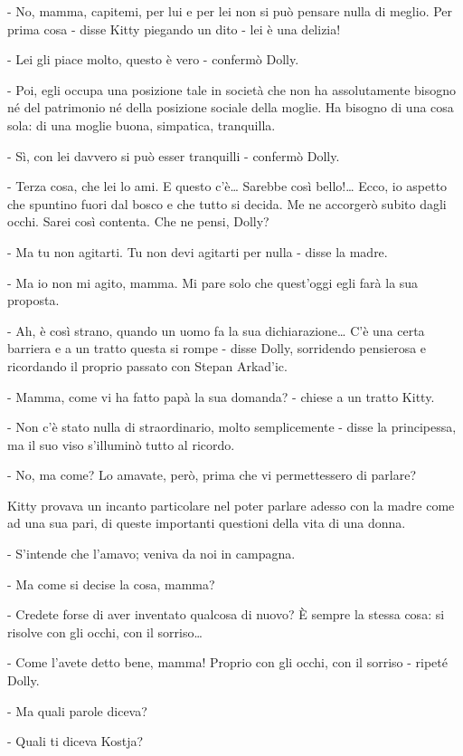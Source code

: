 - No, mamma, capitemi, per lui e per lei non si può pensare nulla di meglio. Per prima cosa - disse Kitty piegando un dito - lei è una delizia! 

- Lei gli piace molto, questo è vero - confermò Dolly. 

- Poi, egli occupa una posizione tale in società che non ha assolutamente bisogno né del patrimonio né della posizione sociale della moglie. Ha bisogno di una cosa sola: di una moglie buona, simpatica, tranquilla. 

- Sì, con lei davvero si può esser tranquilli - confermò Dolly. 

- Terza cosa, che lei lo ami. E questo c'è\ldots{} Sarebbe così bello!\ldots{} Ecco, io aspetto che spuntino fuori dal bosco e che tutto si decida. Me ne accorgerò subito dagli occhi. Sarei così contenta. Che ne pensi, Dolly? 

- Ma tu non agitarti. Tu non devi agitarti per nulla - disse la madre. 

- Ma io non mi agito, mamma. Mi pare solo che quest'oggi egli farà la sua proposta. 

- Ah, è così strano, quando un uomo fa la sua dichiarazione\ldots{} C'è una certa barriera e a un tratto questa si rompe - disse Dolly, sorridendo pensierosa e ricordando il proprio passato con Stepan Arkad'ic. 

- Mamma, come vi ha fatto papà la sua domanda? - chiese a un tratto Kitty. 

- Non c'è stato nulla di straordinario, molto semplicemente - disse la principessa, ma il suo viso s'illuminò tutto al ricordo. 

- No, ma come? Lo amavate, però, prima che vi permettessero di parlare? 

Kitty provava un incanto particolare nel poter parlare adesso con la madre come ad una sua pari, di queste importanti questioni della vita di una donna. 

- S'intende che l'amavo; veniva da noi in campagna. 

- Ma come si decise la cosa, mamma? 

- Credete forse di aver inventato qualcosa di nuovo? È sempre la stessa cosa: si risolve con gli occhi, con il sorriso\ldots{} 

- Come l'avete detto bene, mamma! Proprio con gli occhi, con il sorriso - ripeté Dolly. 

- Ma quali parole diceva? 

- Quali ti diceva Kostja? 

